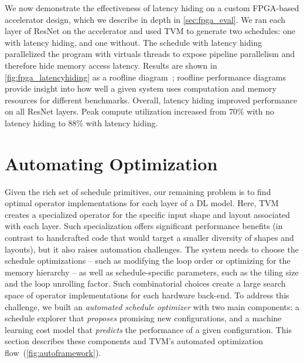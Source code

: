 \documentclass[letterpaper,twocolumn,10pt]{article}
\newcommand{\CMT}[1]{\textcolor{red}{COMMENT: {#1}}}
\newcommand{\TensorOpt}{TVM\xspace}
\begin{document}
We now demonstrate the effectiveness of latency hiding on a custom FPGA-based accelerator design, which we describe in  depth in \autoref{sec:fpga_eval}.
We ran each layer of ResNet on the accelerator and used \TensorOpt to generate two schedules: one with latency hiding, and one without.
The schedule with latency hiding parallelized the program with virtuals threads
to expose pipeline parallelism and therefore hide memory access latency.
Results are shown in \autoref{fig:fpga_latencyhiding} as a roofline diagram~\cite{roofline};
roofline performance diagrams provide insight into how well a given system uses computation and memory resources for different benchmarks.
Overall, latency hiding improved performance on all ResNet layers.
Peak compute utilization increased from 70\% with no latency hiding to 88\% with latency hiding.

\section{Automating Optimization}
\label{sec:auto}

Given the rich set of schedule primitives, our remaining problem is to
find optimal operator implementations for each layer of a DL model. Here,
\TensorOpt creates a specialized operator for the specific input shape and layout associated with each layer.
Such specialization offers significant performance benefits (in contrast to handcrafted code that would target a smaller diversity of shapes and layouts), but it also raises automation challenges.
The system needs to choose the schedule optimizations -- such as modifying the loop order or optimizing for the memory hierarchy -- as well as schedule-specific parameters, such as the tiling size and the loop unrolling factor. Such combinatorial choices create a large search space of operator implementations for each hardware back-end.  To address this challenge, we built an \textit{automated schedule optimizer} with two main components: a schedule explorer that \emph{proposes} promising new configurations, and a machine learning cost model that \emph{predicts} the performance of a given configuration. This section describes these components and \TensorOpt's automated optimization flow~(\autoref{fig:autoframework}).
\end{document}
